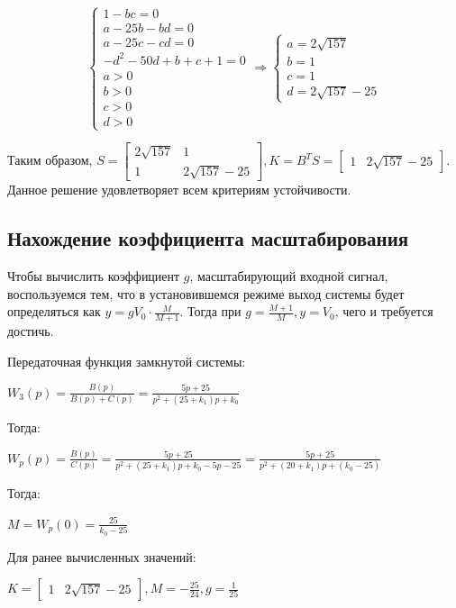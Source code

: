\documentclass[14pt,a4paper,report]{report}
\begin{document}
\begin{equation*}
\begin{cases}
\text{$1-bc=0$} \\
\text{$a-25b-bd=0$} \\
\text{$a-25c-cd=0$} \\
\text{$-d^2-50d+b+c+1=0$} \\
\text{$a>0$} \\
\text{$b>0$} \\
\text{$c>0$} \\
\text{$d>0$} 
\end{cases}
\Longrightarrow
\begin{cases}
\text{$a=2\sqrt{157}$} \\
\text{$b=1$} \\
\text{$c=1$} \\
\text{$d=2\sqrt{157}-25$} 
\end{cases}
\end{equation*}

Таким образом, $S=\begin{bmatrix}
2\sqrt{157} & 1 \\
1 & 2\sqrt{157}-25 
\end{bmatrix}, K=B^TS=\begin{bmatrix} 1 & 2\sqrt{157}-25 \end{bmatrix}$. Данное решение удовлетворяет всем критериям устойчивости.

\subsection{Нахождение коэффициента масштабирования}

Чтобы вычислить коэффициент $g$, масштабирующий входной сигнал, воспользуемся тем, что в установившемся режиме выход системы будет определяться как $y=gV_0\cdot \frac{M}{M+1}$. Тогда при $g=\frac{M+1}{M}, y=V_0$, чего и требуется достичь.

Передаточная функция замкнутой системы:

$W_3(p)=\frac{B(p)}{B(p)+C(p)}=\frac{5p+25}{p^2+(25+k_1)p+k_0}$

Тогда:

$W_p(p)=\frac{B(p)}{C(p)}=\frac{5p+25}{p^2+(25+k_1)p+k_0-5p-25}=\frac{5p+25}{p^2+(20+k_1)p+(k_0-25)}$

Тогда:

$M=W_p(0)=\frac{25}{k_0-25}$

Для ранее вычисленных значений:

$K=\begin{bmatrix} 1 & 2\sqrt{157}-25 \end{bmatrix}, M=-\frac{25}{24}, g=\frac{1}{25}$
\end{document}
